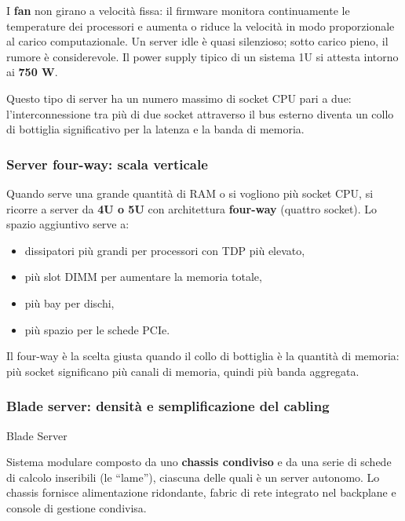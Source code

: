 \documentclass[
  italian,
  openany]{book}
\providecommand{\tightlist}{%
  \setlength{\itemsep}{0pt}\setlength{\parskip}{0pt}}
\begin{document}
I \textbf{fan} non girano a velocità fissa: il firmware monitora
continuamente le temperature dei processori e aumenta o riduce la
velocità in modo proporzionale al carico computazionale. Un server idle
è quasi silenzioso; sotto carico pieno, il rumore è considerevole. Il
power supply tipico di un sistema 1U si attesta intorno ai \textbf{750
W}.

Questo tipo di server ha un numero massimo di socket CPU pari a due:
l'interconnessione tra più di due socket attraverso il bus esterno
diventa un collo di bottiglia significativo per la latenza e la banda di
memoria.

\subsubsection{Server four-way: scala
verticale}\label{server-four-way-scala-verticale}

Quando serve una grande quantità di RAM o si vogliono più socket CPU, si
ricorre a server da \textbf{4U o 5U} con architettura \textbf{four-way}
(quattro socket). Lo spazio aggiuntivo serve a:

\begin{itemize}
\tightlist
\item
  dissipatori più grandi per processori con TDP più elevato,
\item
  più slot DIMM per aumentare la memoria totale,
\item
  più bay per dischi,
\item
  più spazio per le schede PCIe.
\end{itemize}

Il four-way è la scelta giusta quando il collo di bottiglia è la
quantità di memoria: più socket significano più canali di memoria,
quindi più banda aggregata.

\subsubsection{Blade server: densità e semplificazione del
cabling}\label{blade-server-densituxe0-e-semplificazione-del-cabling}

\begin{calloutdefinition}{Blade Server}

Sistema modulare composto da uno \textbf{chassis condiviso} e da una
serie di schede di calcolo inseribili (le ``lame''), ciascuna delle
quali è un server autonomo. Lo chassis fornisce alimentazione
ridondante, fabric di rete integrato nel backplane e console di gestione
condivisa.

\end{calloutdefinition}
\end{document}
